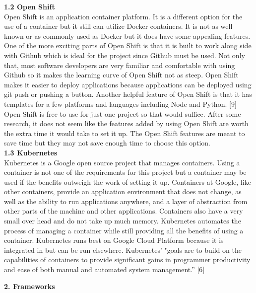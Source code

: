 \documentclass[letterpaper,10pt,draftclsnofoot,onecolumn,]{IEEEtran}
\begin{document}
\textbf{1.2 Open Shift}\\
Open Shift is an application container platform. It is a different option for the use of a container but it still can utilize Docker containers. It is not as well known or as commonly used as Docker but it does have some appealing features. One of the more exciting parts of Open Shift is that it is built to work along side with Github which is ideal for the project since Github must be used. Not only that, most software developers are very familiar and comfortable with using Github so it makes the learning curve of Open Shift not as steep. Open Shift makes it easier to deploy applications because applications can be deployed using git push or pushing a button. Another helpful feature of Open Shift is that it has templates for a few platforms and languages including Node and Python. [9] Open Shift is free to use for just one project so that would suffice. After some research, it does not seem like the features added by using Open Shift are worth the extra time it would take to set it up. The Open Shift features are meant to save time but they may not save enough time to choose this option.\\

\textbf{1.3 Kubernetes}\\
Kubernetes is a Google open source project that manages containers. Using a container is not one of the requirements for this project but a container may be used if the benefits outweigh the work of setting it up. Containers at Google, like other containers, provide an application environment that does not change, as well as the ability to run applications anywhere, and a layer of abstraction from other parts of the machine and other applications. Containers also have a very small over head and do not take up much memory. Kubernetes automates the process of managing a container while still providing all the benefits of using a container. Kubernetes runs best on Google Cloud Platform because it is integrated in but can be run elsewhere. Kubernetes' "goals are to build on the capabilities of containers to provide significant gains in programmer productivity and ease of both manual and automated system management.” [6]\\


\begin{center}
\textbf{2. Frameworks}\\
\end{center}
\end{document}
